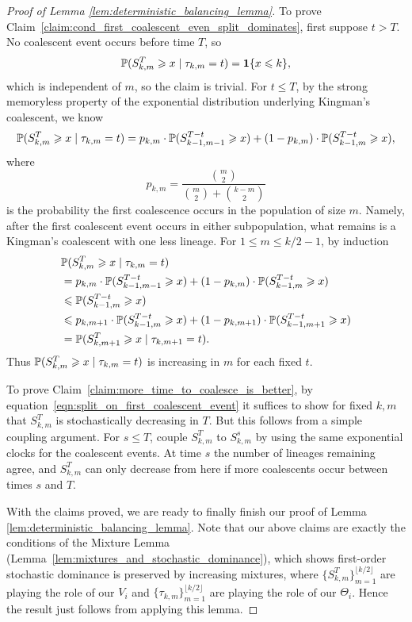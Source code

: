\begin{proof}[Proof of Lemma \ref{lem:deterministic_balancing_lemma}]
 To prove Claim~\ref{claim:cond_first_coalescent_even_split_dominates}, first suppose $t > T$. No coalescent event occurs before time $T$, so
\[
\P(S_{k,m}^T \geq x \mid \tau_{k,m}=t)=\ind\{x\leq k\},
\]
which is independent of $m$, so the claim is trivial. For $t \leq T$, by the strong
memoryless property of the exponential distribution underlying Kingman's coalescent, we know
\begin{equation}
\P(S_{k,m}^T \geq x \; | \; \tau_{k,m} = t) = p_{k,m} \cdot \P(S_{k-1,m-1}^{T-t} \geq x) + (1-p_{k, m}) \cdot \P(S_{k-1,m}^{T-t} \geq x),
\label{eqn:split_on_first_coalescent_event}
\end{equation}
where
\[
p_{k,m} = \frac{\binom{m}{2}}{\binom{m}{2} + \binom{k-m}{2}}
\]
is the probability the first coalescence occurs in the population of size $m$.
Namely, after the first coalescent event occurs in either subpopulation, what remains
is a Kingman's coalescent with one less lineage. For $1 \leq m \leq k/2 - 1$, by induction
\begin{align*}
& \P(S_{k,m}^T \geq x \; | \; \tau_{k,m} = t)\\
&= p_{k,m} \cdot \P(S_{k-1,m-1}^{T-t} \geq x) + (1-p_{k, m}) \cdot \P(S_{k-1,m}^{T-t} \geq x) \\
&\leq \P(S_{k-1,m}^{T-t} \geq x) \\
&\leq p_{k,m+1} \cdot \P(S_{k-1,m}^{T-t} \geq x) + (1-p_{k, m+1}) \cdot \P(S_{k-1,m+1}^{T-t} \geq x)\\
&= \P(S_{k,m+1}^T \geq x \; | \; \tau_{k,m+1} = t).
\end{align*}
Thus $\P(S_{k,m}^T \geq x \; | \; \tau_{k,m} = t)$ is increasing in $m$ for each fixed $t$.

 To prove Claim~\ref{claim:more_time_to_coalesce_is_better}, by equation~\eqref{eqn:split_on_first_coalescent_event} it suffices
 to show for fixed $k,m$ that $S^T_{k,m}$ is stochastically decreasing in $T$. But this follows from a
 simple coupling argument. For $s \leq T$, couple $S_{k,m}^T$ to $S_{k,m}^s$ by using the same
 exponential clocks for the coalescent events. At time $s$ the number of lineages
 remaining agree, and $S^T_{k,m}$ can only decrease from here if more coalescents
  occur between times $s$ and $T$.

With the claims proved, we are ready to finally finish our proof of
Lemma \ref{lem:deterministic_balancing_lemma}. Note that our above claims are exactly the
conditions of the Mixture Lemma (Lemma~\ref{lem:mixtures_and_stochastic_dominance}), which shows first-order 
stochastic dominance is preserved by increasing mixtures, where $\{S_{k,m}^T\}_{m=1}^{\lfloor k/2\rfloor}$ are playing the
role of our $V_i$ and $\{\tau_{k,m}\}_{m=1}^{\lfloor k/2\rfloor}$ are playing the role of our $\Theta_i$.
Hence the result just follows from applying this lemma.
\end{proof}

